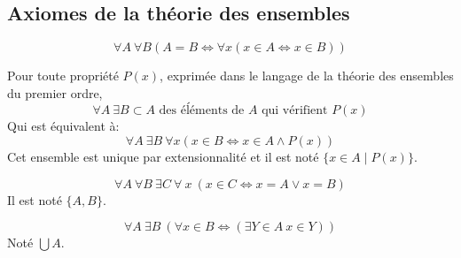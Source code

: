 \subsection{Axiomes de la théorie des ensembles}

\begin{axiom} [Extensionnalité]
	$$\forall A \ \forall B ( A = B \iff \forall x (x \in A \iff x \in B))$$
\end{axiom}

\begin{axiom} [Compréhension]
	Pour toute propriété $P(x)$, exprimée dans le langage de la théorie des ensembles du premier ordre,
	$$ \forall A \ \exists B \subset A \text{ des éĺéments de } A \text{ qui vérifient } P(x)$$
	Qui est équivalent à:
	$$ \forall A \  \exists B \  \forall x (x \in B \iff x \in A \land P(x))$$
	Cet ensemble est unique par extensionnalité et il est noté $\{x \in A \mid P(x)\}$.
\end{axiom}

\begin{axiom}
	$$ \forall A \  \forall B \  \exists C \  \forall \ x \  (x \in C \iff x = A \lor x = B)$$
	Il est noté $\{A,B\}$.
\end{axiom}


\begin{axiom}[Réunion]
	$$ \forall A \ \exists B \ (\forall x \in B \iff (\exists Y \in A  \ x \in  Y))$$
    Noté $\bigcup A$.
\end{axiom}


